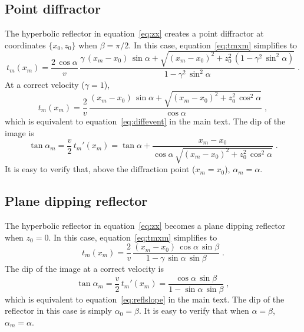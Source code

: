 \subsection{Point diffractor}

The hyperbolic reflector in equation~\ref{eq:zx} creates a point diffractor at coordinates $\{x_0,z_0\}$ when $\beta=\pi/2$.  In this case, equation~\ref{eq:tmxm}
simplifies to \cite[]{klokov12}
\begin{equation}
\label{eq:dtmxm}
t_m(x_m) = \frac{2\,\cos{\alpha}}{v}\,\frac{\gamma\,(x_m-x_0)\,\sin{\alpha} + \sqrt{(x_m-x_0)^2+z_0^2\,\left(1-\gamma^2\,\sin^2{\alpha}\right)}}{1-\gamma^2\,\sin^2{\alpha}}\;.
\end{equation}
At a correct velocity ($\gamma=1$),
\begin{equation}
\label{eq:dtmxmc}
t_m(x_m) = \frac{2}{v}\,\frac{(x_m-x_0)\,\sin{\alpha} + \sqrt{(x_m-x_0)^2+z_0^2\,\cos^2{\alpha}}}{\cos{\alpha}}\;,
\end{equation}
which is equivalent to equation~\ref{eq:diffevent} in the main text. The dip of the image is
\begin{equation}
  \label{eq:dalfam}
  \tan{\alpha_m} = \frac{v}{2}\,t_m'(x_m) = \tan{\alpha} + \frac{x_m-x_0}{\cos{\alpha}\,\sqrt{(x_m-x_0)^2+z_0^2\,\cos^2{\alpha}}}\;.
\end{equation}
It is easy to verify that, above the diffraction point ($x_m=x_0$), $\alpha_m=\alpha$.

\subsection{Plane dipping reflector}

The hyperbolic reflector in equation~\ref{eq:zx} becomes a plane
dipping reflector when $z_0=0$. In this case, equation~\ref{eq:tmxm}
simplifies to \cite[]{klokov12}
\begin{equation}
  \label{eq:ptmxm}
  t_m(x_m) = \frac{2}{v}\,\frac{(x_m-x_0)\,\cos{\alpha}\,\sin{\beta}}{1-\gamma\,\sin{\alpha}\,\sin{\beta}}\;.
\end{equation}
The dip of the image at a correct velocity is
\begin{equation}
  \label{eq:palfam}
  \tan{\alpha_m} = \frac{v}{2}\,t_m'(x_m) = \frac{\cos{\alpha}\,\sin{\beta}}{1-\sin{\alpha}\,\sin{\beta}}\;,
\end{equation}
which is equivalent to equation~\ref{eq:reflslope} in the main text. The dip of the reflector in this case is simply $\alpha_0=\beta$. It
is easy to verify that when $\alpha=\beta$, $\alpha_m=\alpha$.



